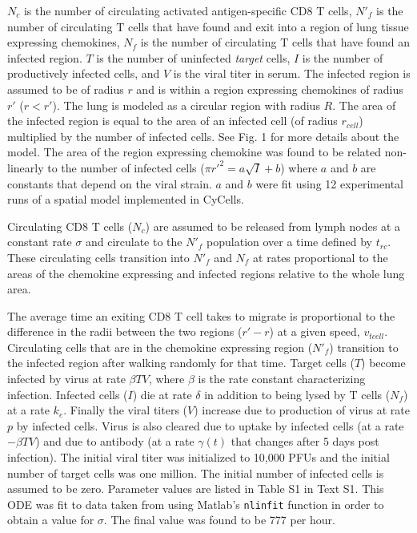\documentclass[10pt]{article}
\begin{document}
$N_{c}$ is the number of circulating activated antigen-specific CD8 T cells, $N'_{f}$ is the number of circulating T cells that have found and exit into a region of lung tissue expressing chemokines, $N_{f}$ is the number of circulating T cells that have found an infected region. $T$ is the number of uninfected \textit{target} cells, $I$ is the number of productively infected cells, and $V$ is the viral titer in serum. The infected region is assumed to be of radius $r$ and is within a region expressing chemokines of radius $r'$ ($r  < r'$). The lung is modeled as a circular region with radius $R$. The area of the infected region is equal to the area of an infected cell (of radius $r_{cell}$) multiplied by the number of infected cells. See Fig. 1 for more details about the model.  The area of the region expressing chemokine was found to be related non-linearly to the number of infected cells ($\pi r'^{2} = a \sqrt{I} + b$) where $a$ and $b$ are constants that depend on the viral strain.  $a$ and $b$ were fit using 12 experimental runs of a spatial model implemented in CyCells.

Circulating CD8 T cells ($N_{c}$) are assumed to be released from lymph nodes at a constant rate $\sigma$ and circulate to the $N'_{f}$ population over a time defined by $t_{rc}$. These circulating cells transition into $N'_{f}$ and $N_{f}$ at rates proportional to the areas of the chemokine expressing and infected regions relative to the whole lung area. 

The average time an exiting CD8 T cell takes to migrate is proportional to the difference in the radii between the two regions ($r' - r$) at a given speed, $v_{tcell}$.  Circulating cells that are in the chemokine expressing region ($N'_{f}$) transition to the infected region after walking randomly for that time. Target cells ($T$) become infected by virus at rate $\beta TV$, where $\beta$ is the rate constant characterizing infection. Infected cells ($I$) die at rate $\delta$ in addition to being lysed by T cells ($N_{f}$) at a rate $k_{e}$. Finally the viral titers ($V$) increase due to production of virus at rate $p$ by infected cells. Virus is also cleared due to uptake by infected cells (at a rate $- \beta TV$) and due to antibody (at a rate $\gamma (t)$ that changes after 5 days post infection). The initial viral titer was initialized to 10,000 PFUs and the initial number of target cells was one million. The initial number of infected cells is assumed to be zero. Parameter values are listed in Table S1 in Text S1.  This ODE was fit to data taken from \cite{Miao2010} using Matlab's \texttt{nlinfit} function in order to obtain a value for $\sigma$.  The final value was found to be 777 per hour.
\end{document}
